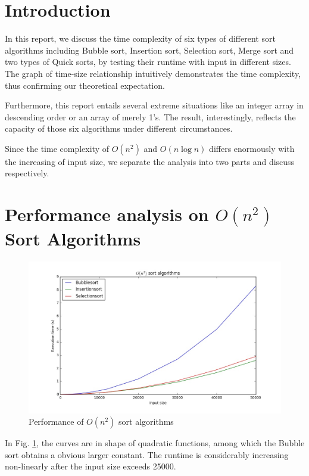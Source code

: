 
\section{Introduction}
In this report, we discuss the time complexity of six types of different sort algorithms including Bubble sort, Insertion sort, Selection sort, Merge sort and two types of Quick sorts, by testing their runtime with input in different sizes. The graph of time-size relationship intuitively demonstrates the time complexity, thus confirming our theoretical expectation.

Furthermore, this report entails several extreme situations like an integer array in descending order or an array of merely 1's. The result, interestingly, reflects the capacity of those six algorithms under different circumstances.

Since the time complexity of $O(n^2)$ and $O(n\log n)$ differs enormously with the increasing of input size, we separate the analysis into two parts and discuss respectively.

\section{Performance analysis on $O(n^2)$ Sort Algorithms}
\begin{figure}[H]
    \centering
    \includegraphics[width=0.8\linewidth]{../a1/012}
    \caption{Performance of $O(n^2)$ sort algorithms}\label{012}
\end{figure}
In Fig. \ref{012}, the curves are in shape of quadratic functions, among which the Bubble sort obtains a obvious larger constant. The runtime is considerably increasing non-linearly after the input size exceeds 25000.

